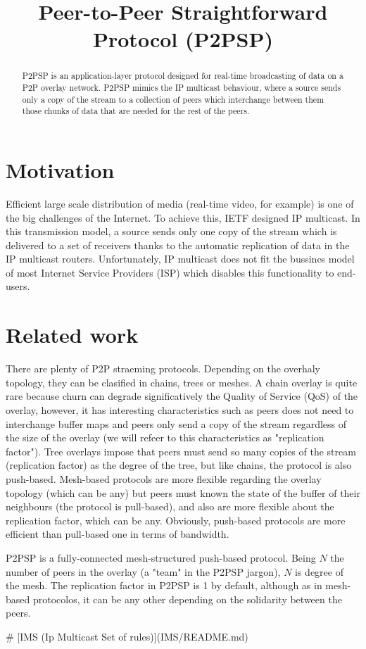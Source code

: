 \documentclass{article}
\title{Peer-to-Peer Straightforward Protocol (P2PSP)}
\begin{document}
\maketitle

\begin{abstract}
  P2PSP is an application-layer protocol designed for real-time
  broadcasting of data on a P2P overlay network. P2PSP mimics the IP
  multicast behaviour, where a source sends only a copy of the stream
  to a collection of peers which interchange between them those chunks
  of data that are needed for the rest of the peers.
\end{abstract}

\section{Motivation}

Efficient large scale distribution of media (real-time video, for
example) is one of the big challenges of the Internet. To achieve
this, IETF designed IP multicast. In this transmission model, a source
sends only one copy of the stream which is delivered to a set of
receivers thanks to the automatic replication of data in the IP
multicast routers. Unfortunately, IP multicast does not fit the
bussines model of most Internet Service Providers (ISP) which disables
this functionality to end-users.

\section{Related work}

There are plenty of P2P straeming protocols. Depending on the overhaly
topology, they can be clasified in chains, trees or meshes. A chain
overlay is quite rare because churn can degrade significatively the
Quality of Service (QoS) of the overlay, however, it has interesting
characteristics such as peers does not need to interchange buffer maps
and peers only send a copy of the stream regardless of the size of the
overlay (we will refeer to this characteristics as "replication
factor"). Tree overlays impose that peers must send so many copies of
the stream (replication factor) as the degree of the tree, but like
chains, the protocol is also push-based. Mesh-based protocols are more
flexible regarding the overlay topology (which can be any) but peers
must known the state of the buffer of their neighbours (the protocol
is pull-based), and also are more flexible about the replication
factor, which can be any. Obviously, push-based protocols are more
efficient than pull-based one in terms of bandwidth.

P2PSP is a fully-connected mesh-structured push-based protocol. Being
$N$ the number of peers in the overlay (a "team" in the P2PSP jargon),
$N$ is degree of the mesh. The replication factor in P2PSP is 1 by
default, although as in mesh-based protocolos, it can be any other
depending on the solidarity between the peers.

# [IMS (Ip Multicast Set of rules)](IMS/README.md)
\end{document}

